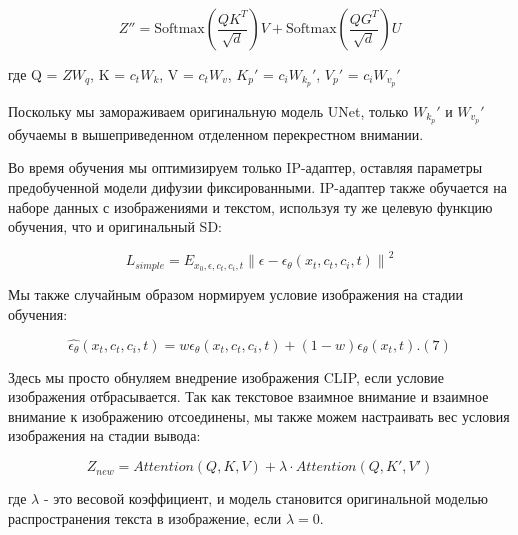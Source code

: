 \documentclass{article}
\begin{document}
\[ Z'' = \text{Softmax}\left(\frac{QK^T}{\sqrt{d}}\right)V + \text{Softmax}\left(\frac{QG^T}{\sqrt{d}}\right)U \]

где Q = \(ZW_q\), K = \(c_tW_k\), V = \(c_tW_v\), \(K_p'\) = \(c_iW_k_p'\),  \(V_p'\) = \(c_iW_v_p'\)

Поскольку мы замораживаем оригинальную модель UNet, только \(W_k_p'\) и \(W_v_p'\) обучаемы в вышеприведенном отделенном перекрестном внимании.

Во время обучения мы оптимизируем только IP-адаптер, оставляя параметры предобученной модели дифузии фиксированными. IP-адаптер также обучается на наборе данных с изображениями и текстом, используя ту же целевую функцию обучения, что и оригинальный SD:

\[
L_{simple} = E_{x_{0},\epsilon,c_{t},c_{i},t} \left\| \epsilon - \epsilon_{\theta}(x_{t},c_{t},c_{i},t) \right\|^2
\]

Мы также случайным образом нормируем условие изображения на стадии обучения:

\[
\hat{\epsilon_{\theta}}(x_{t}, c_{t}, c_{i}, t) = w \epsilon_{\theta}(x_{t}, c_{t}, c_{i}, t) + (1 - w) \epsilon_{\theta}(x_{t}, t). (7)
\]

Здесь мы просто обнуляем внедрение изображения CLIP, если условие изображения отбрасывается.
Так как текстовое взаимное внимание и взаимное внимание к изображению отсоединены, мы также можем настраивать вес условия изображения на стадии вывода:

\[
Z_{new} = Attention(Q,K,V) + \lambda \cdot Attention(Q,K',V')
\]

где $\lambda$ - это весовой коэффициент, и модель становится оригинальной моделью распространения текста в изображение, если $\lambda = 0$.
\end{document}
